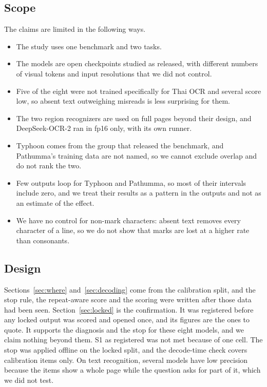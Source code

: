 \subsection{Scope}
The claims are limited in the following ways.
\begin{itemize}
\item The study uses one benchmark and two tasks.
\item The models are open checkpoints studied as released, with different numbers of visual tokens and input resolutions that we did not control.
\item Five of the eight were not trained specifically for Thai OCR and several score low, so absent text outweighing misreads is less surprising for them.
\item The two region recognizers are used on full pages beyond their design, and DeepSeek-OCR-2 ran in fp16 only, with its own runner.
\item Typhoon comes from the group that released the benchmark, and Pathumma's training data are not named, so we cannot exclude overlap and do not rank the two.
\item Few outputs loop for Typhoon and Pathumma, so most of their intervals include zero, and we treat their results as a pattern in the outputs and not as an estimate of the effect.
\item We have no control for non-mark characters: absent text removes every character of a line, so we do not show that marks are lost at a higher rate than consonants.
\end{itemize}

\subsection{Design}
Sections~\ref{sec:where} and~\ref{sec:decoding} come from the calibration split, and the stop rule, the repeat-aware score and the scoring were written after those data had been seen. Section~\ref{sec:locked} is the confirmation. It was registered before any locked output was scored and opened once, and its figures are the ones to quote. It supports the diagnosis and the stop for these eight models, and we claim nothing beyond them. S1 as registered was not met because of one cell. The stop was applied offline on the locked split, and the decode-time check covers calibration items only. On text recognition, several models have low precision because the items show a whole page while the question asks for part of it, which we did not test.

